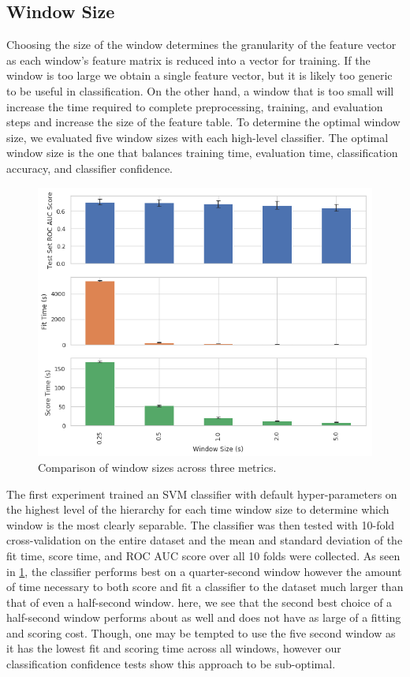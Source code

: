 \subsection{Window Size}

Choosing the size of the window determines the granularity of the feature vector as each window's feature matrix is reduced into a vector for training. If the window is too large we obtain a single feature vector, but it is likely too generic to be useful in classification. On the other hand, a window that is too small will increase the time required to complete preprocessing, training, and evaluation steps and increase the size of the feature table. To determine the optimal window size, we evaluated five window sizes with each high-level classifier. The optimal window size is the one that balances training time, evaluation time, classification accuracy, and classifier confidence.

\begin{figure}[h]
    \centering
    \includegraphics[width=.48\textwidth]{figures/ROC-AUC-Window-Compare.png}
    \caption{Comparison of window sizes across three metrics.}
    \label{fig:roc-auc-window}
\end{figure}

The first experiment trained an SVM classifier with default hyper-parameters on the highest level of the hierarchy for each time window size to determine which window is the most clearly separable. The classifier was then tested with 10-fold cross-validation on the entire dataset and the mean and standard deviation of the fit time, score time, and ROC AUC score over all 10 folds were collected. As seen in \cref{fig:roc-auc-window}, the classifier performs best on a quarter-second window however the amount of time necessary to both score and fit a classifier to the dataset much larger than that of even a half-second window. here, we see that the second best choice of a half-second window performs about as well and does not have as large of a fitting and scoring cost. Though, one may be tempted to use the five second window as it has the lowest fit and scoring time across all windows, however our classification confidence tests show this approach to be sub-optimal.


